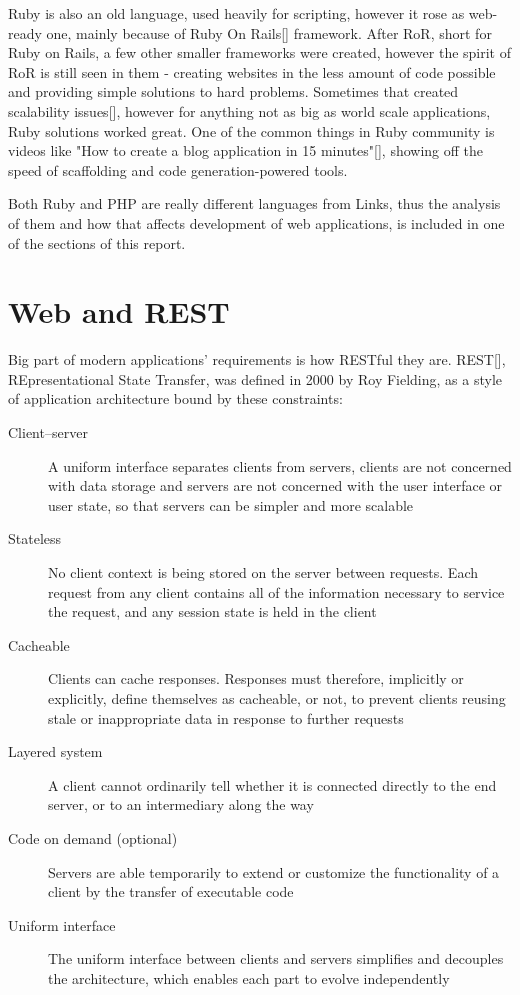 Ruby is also an old language, used heavily for scripting, however it rose as web-ready one, mainly because of Ruby On Rails[] framework. After RoR, short for Ruby on Rails, a few other smaller frameworks were created, however the spirit of RoR is still seen in them - creating websites in the less amount of code possible and providing simple solutions to hard problems. Sometimes that created scalability issues[], however for anything not as big as world scale applications, Ruby solutions worked great. One of the common things in Ruby community is videos like "How to create a blog application in 15 minutes"[], showing off the speed of scaffolding and code generation-powered tools. 

Both Ruby and PHP are really different languages from Links, thus the analysis of them and how that affects development of web applications, is included in one of the sections of this report. 

\section{Web and REST}

Big part of modern applications' requirements is how RESTful they are. REST[], REpresentational State Transfer, was defined in 2000 by Roy Fielding, as a style of application architecture bound by these constraints:

\begin{description}
  \item[Client–server] A uniform interface separates clients from servers, clients are not concerned with data storage and servers are not concerned with the user interface or user state, so that servers can be simpler and more scalable
  \item[Stateless] No client context is being stored on the server between requests. Each request from any client contains all of the information necessary to service the request, and any session state is held in the client
  \item[Cacheable] Clients can cache responses. Responses must therefore, implicitly or explicitly, define themselves as cacheable, or not, to prevent clients reusing stale or inappropriate data in response to further requests
  \item[Layered system] A client cannot ordinarily tell whether it is connected directly to the end server, or to an intermediary along the way
  \item[Code on demand (optional)] Servers are able temporarily to extend or customize the functionality of a client by the transfer of executable code
  \item[Uniform interface] The uniform interface between clients and servers simplifies and decouples the architecture, which enables each part to evolve independently
\end{description}

